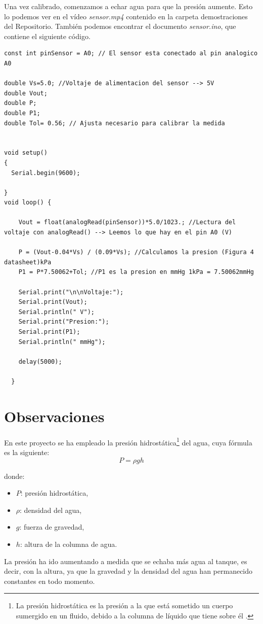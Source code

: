 Una vez calibrado, comenzamos a echar agua para que la presión aumente. Esto lo podemos ver en el vídeo \textit{sensor.mp4} contenido en la carpeta demostraciones del Repositorio. También podemos encontrar el documento \textit{sensor.ino}, que contiene el siguiente código.

\begin{lstlisting}
const int pinSensor = A0; // El sensor esta conectado al pin analogico A0

double Vs=5.0; //Voltaje de alimentacion del sensor --> 5V
double Vout;
double P; 
double P1;
double Tol= 0.56; // Ajusta necesario para calibrar la medida


void setup()
{
  Serial.begin(9600);
  
}
void loop() {
    
    Vout = float(analogRead(pinSensor))*5.0/1023.; //Lectura del voltaje con analogRead() --> Leemos lo que hay en el pin A0 (V)
  
    P = (Vout-0.04*Vs) / (0.09*Vs); //Calculamos la presion (Figura 4 datasheet)kPa
    P1 = P*7.50062+Tol; //P1 es la presion en mmHg 1kPa = 7.50062mmHg 
    
    Serial.print("\n\nVoltaje:");
    Serial.print(Vout);
    Serial.println(" V");
    Serial.print("Presion:");
    Serial.print(P1);
    Serial.println(" mmHg");
  
    delay(5000);
    
  }
\end{lstlisting}

\section{Observaciones}
En este proyecto se ha empleado la presión hidrostática\footnote{La presión hidrostática es la presión a la que está sometido un cuerpo sumergido en un fluido, debido a la columna de líquido que tiene sobre él \cite{presionhidro}.} del agua, cuya fórmula es la siguiente: 
\[
P = \rho g h
\]

donde:
\begin{itemize}
    \item \( P \): presión hidrostática,
    \item \( \rho \): densidad del agua,
    \item \( g \): fuerza de gravedad,
    \item \( h \): altura de la columna de agua.
\end{itemize}

La presión ha ido aumentando a medida que se echaba más agua al tanque, es decir, con la altura, ya que la gravedad y la densidad del agua han permanecido constantes en todo momento.